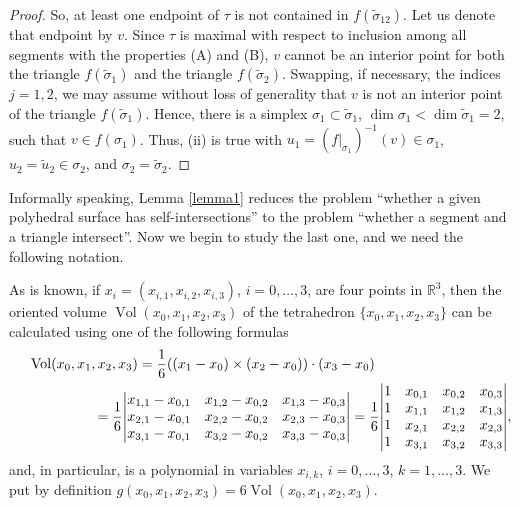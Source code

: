 \documentclass[12pt, reqno]{amsart}
\begin{document}
\begin{proof}
So, at least one endpoint of  
$\tau$ 
is not contained in 
$f(\widetilde{\sigma}_{12})$.
Let us denote that endpoint by
$v$.
Since
$\tau$
is maximal with respect to inclusion among all segments with the properties (A) and (B),
$v$ 
cannot be an interior point for both the triangle 
$f(\widetilde{\sigma}_1)$ 
and the triangle 
$f(\widetilde{\sigma}_2)$.
Swapping, if necessary, the indices 
$j=1,2$, 
we may assume without loss of generality that 
$v$
is not an interior point of the triangle 
$f(\widetilde{\sigma}_1)$.
Hence, there is a simplex 
${\sigma_1}\subset\widetilde{\sigma}_1$,
$\dim {\sigma}_1 <\dim \widetilde{\sigma}_1=2$,
such that
$v\in f(\sigma_1)$.
Thus, (ii) is true with
$u_1=(f\vert_{\sigma_1})^{-1}(v)\in\sigma_1$,
$u_2=\widetilde{u}_2\in\sigma_2$,
and 
$\sigma_2=\widetilde{\sigma}_2$.
\end{proof}

Informally speaking, Lemma \ref{lemma1} reduces the problem ``whether a given 
polyhedral surface has self-intersections'' to the problem ``whether a segment 
and a triangle intersect''.
Now we begin to study the last one, and we need the following notation.

As is known, if 
$x_i=(x_{i,1},x_{i,2}, x_{i,3})$, $i=0,\dots,3$, 
are four points in 
$\mathbb{R}^3$, 
then the oriented volume 
$\operatorname{Vol}(x_0, x_1, x_2, x_3)$ 
of the tetrahedron 
$\{x_0, x_1, x_2, x_3\}$
can be calculated using one of the following formulas
\begin{equation*}
\begin{split}
\operatorname{Vol}(x_0, x_1, x_2, x_3)= 
{\frac16}((x_1-x_0)\times (x_2-x_0))\cdot (x_3-x_0)\hphantom{AAAAAAAAAAAAA}\\
\hphantom{AAAAAAAA} ={\frac16}{\begin{vmatrix}
x_{1,1}-x_{0,1}&x_{1,2}-x_{0,2}&x_{1,3}-x_{0,3}\\
x_{2,1}-x_{0,1}&x_{2,2}-x_{0,2}&x_{2,3}-x_{0,3}\\
x_{3,1}-x_{0,1}&x_{3,2}-x_{0,2}&x_{3,3}-x_{0,3}
\end{vmatrix}}
={\frac16}{\begin{vmatrix}
1&x_{0,1}&x_{0,2}&x_{0,3}\\
1&x_{1,1}&x_{1,2}&x_{1,3}\\
1&x_{2,1}&x_{2,2}&x_{2,3}\\
1&x_{3,1}&x_{3,2}&x_{3,3}
\end{vmatrix}},
\end{split}
\end{equation*}
and, in particular, is a polynomial in variables 
$x_{i,k}$, $i=0,\dots,3$, $k=1,\dots,3$.
We put by definition 
$g(x_0, x_1, x_2, x_3)= 6\operatorname{Vol}(x_0, x_1, x_2, x_3)$.
 
\end{document}
